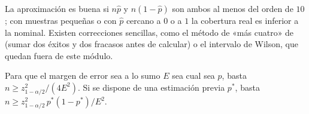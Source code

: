 La aproximación es buena si $n\widehat p$ y $n(1-\widehat p)$ son ambos al menos del orden de $10$; con muestras pequeñas o con $\widehat p$ cercano a $0$ o a $1$ la cobertura real es inferior a la nominal. Existen correcciones sencillas, como el método de «más cuatro» de~\cite[§8.3]{openstax} (sumar dos éxitos y dos fracasos antes de calcular) o el intervalo de Wilson, que quedan fuera de este módulo.

\begin{corolario}\label{cor:t4-tamano-p}
Para que el margen de error sea a lo sumo $E$ sea cual sea $p$, basta $n\ge z_{1-\alpha/2}^{2}/(4E^{2})$. Si se dispone de una estimación previa $p^{*}$, basta $n\ge z_{1-\alpha/2}^{2}\,p^{*}(1-p^{*})/E^{2}$.
\end{corolario}

\addtocounter{definicion}{1}%

\addtocounter{definicion}{1}%

\addtocounter{definicion}{1}%

